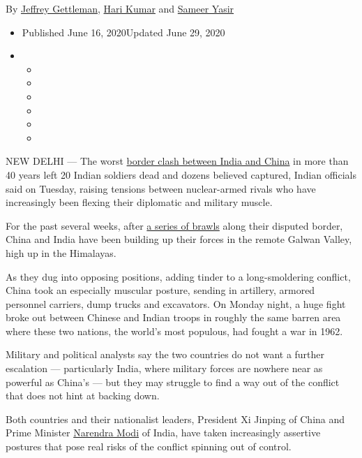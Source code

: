 By \href{https://www.nytimes.com/by/jeffrey-gettleman}{Jeffrey
Gettleman}, \href{https://www.nytimes.com/by/hari-kumar}{Hari Kumar} and
\href{https://www.nytimes.com/by/sameer-yasir}{Sameer Yasir}

\begin{itemize}
\item
  Published June 16, 2020Updated June 29, 2020
\item
  \begin{itemize}
  \item
  \item
  \item
  \item
  \item
  \item
  \end{itemize}
\end{itemize}

NEW DELHI --- The worst
\href{https://www.nytimes.com/2020/06/17/world/asia/india-china-border-clashes.html}{border
clash between India and China} in more than 40 years left 20 Indian
soldiers dead and dozens believed captured, Indian officials said on
Tuesday, raising tensions between nuclear-armed rivals who have
increasingly been flexing their diplomatic and military muscle.

For the past several weeks, after
\href{https://www.nytimes.com/2020/05/30/world/asia/india-china-border.html}{a
series of brawls} along their disputed border, China and India have been
building up their forces in the remote Galwan Valley, high up in the
Himalayas.

As they dug into opposing positions, adding tinder to a long-smoldering
conflict, China took an especially muscular posture, sending in
artillery, armored personnel carriers, dump trucks and excavators. On
Monday night, a huge fight broke out between Chinese and Indian troops
in roughly the same barren area where these two nations, the world's
most populous, had fought a war in 1962.

Military and political analysts say the two countries do not want a
further escalation --- particularly India, where military forces are
nowhere near as powerful as China's --- but they may struggle to find a
way out of the conflict that does not hint at backing down.

Both countries and their nationalist leaders, President Xi Jinping of
China and Prime Minister
\href{https://www.nytimes.com/2020/06/17/world/asia/india-china-border-clashes.html}{Narendra
Modi} of India, have taken increasingly assertive postures that pose
real risks of the conflict spinning out of control.

